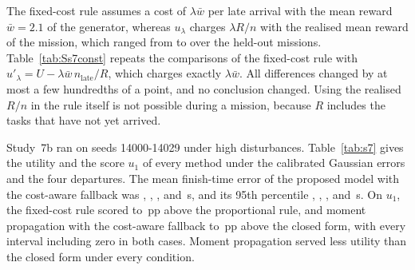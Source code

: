 The fixed-cost rule assumes a cost of $\lambda\bar w$ per late arrival with the mean reward $\bar w=2.1$ of the
generator, whereas $u_\lambda$ charges $\lambda R/n$ with the realised mean reward of the mission, which ranged from
 to  over the held-out missions. Table~\ref{tab:Ss7const} repeats the comparisons of the
fixed-cost rule with $u'_\lambda=U-\lambda\bar w\,n_{\mathrm{late}}/R$, which charges exactly $\lambda\bar w$. All
differences changed by at most a few hundredths of a point, and no conclusion changed. Using the realised $R/n$ in the
rule itself is not possible during a mission, because $R$ includes the tasks that have not yet arrived.


Study~7b ran on seeds 14000-14029 under high disturbances. Table~\ref{tab:s7} gives the utility and the score $u_1$ of
every method under the calibrated Gaussian errors and the four departures. The mean finish-time error of the proposed
model with the cost-aware fallback was , , ,  and
\,s, and its 95th percentile , , ,
 and \,s. On $u_1$, the fixed-cost rule scored  to
\,pp above the proportional rule, and moment propagation with the cost-aware fallback
 to \,pp above the closed form, with every interval including zero in
both cases. Moment propagation served less utility than the closed form under every condition.


